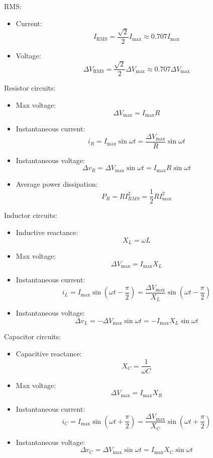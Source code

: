 \documentclass[10pt, twocolumn]{article}
\begin{document}
RMS:
\begin{itemize}
  \item Current:
        \[
          I_{\mathrm{RMS}} = \frac{\sqrt{2}}{2}I_{\mathrm{max}} \approx 0.707I_{\mathrm{max}}
        \]
  \item Voltage:
        \[
          \Delta V_{\mathrm{RMS}} = \frac{\sqrt{2}}{2}\Delta V_{\mathrm{max}} \approx 0.707\Delta V_{\mathrm{max}}
        \]
\end{itemize}

Resistor circuits:
\begin{itemize}
  \item Max voltage:
        \[
          \Delta V_{\mathrm{max}} = I_{\mathrm{max}}R
        \]
  \item Instantaneous current:
        \[
          i_R = I_{\mathrm{max}}\sin{\omega t} = \frac{\Delta V_{\mathrm{max}}}{R}\sin{\omega t}
        \]
  \item Instantaneous voltage:
        \[
          \Delta v_R = \Delta V_{\mathrm{max}}\sin{\omega t} = I_{\mathrm{max}}R\sin{\omega t}
        \]
  \item Average power dissipation:
        \[
          P_R = RI_{RMS}^2 = \frac{1}{2}RI_{\mathrm{max}}^2
        \]
\end{itemize}

Inductor circuits:
\begin{itemize}
  \item Inductive reactance:
        \[
          X_L = \omega L
        \]
  \item Max voltage:
        \[
          \Delta V_{\mathrm{max}} = I_{\mathrm{max}}X_L
        \]
  \item Instantaneous current:
        \[
          i_L = I_{\mathrm{max}}\sin\left( \omega t - \frac{\pi}{2} \right) = \frac{\Delta V_{\mathrm{max}}}{X_L }\sin\left( \omega t - \frac{\pi}{2} \right)
        \]
  \item Instantaneous voltage:
        \[
          \Delta v_L = - \Delta V_{\mathrm{max}}\sin{\omega t} = -I_{\mathrm{max}}X_L \sin{\omega t}
        \]
\end{itemize}

Capacitor circuits:
\begin{itemize}
  \item Capacitive reactance:
        \[
          X_C = \frac{1}{\omega C}
        \]
  \item Max voltage:
        \[
          \Delta V_{\mathrm{max}} = I_{\mathrm{max}}X_R
        \]
  \item Instantaneous current:
        \[
          i_C = I_{\mathrm{max}}\sin\left( \omega t + \frac{\pi}{2} \right) = \frac{\Delta V_{\mathrm{max}}}{X_C }\sin\left( \omega t + \frac{\pi}{2} \right)
        \]
  \item Instantaneous voltage:
        \[
          \Delta v_C = \Delta V_{\mathrm{max}}\sin{\omega t} = I_{\mathrm{max}}X_C \sin{\omega t}
        \]
\end{itemize}
\end{document}
